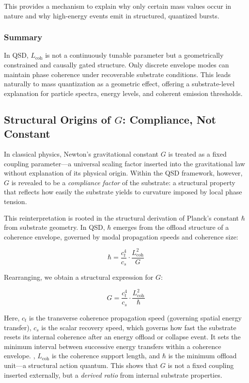 \documentclass[entropy,article,submit,pdftex,moreauthors]{Definitions/mdpi}
\begin{document}
This provides a mechanism to explain why only certain mass values occur in nature and why high-energy events emit in structured, quantized bursts.

\subsubsection{Summary}

In QSD, $L_{\text{coh}}$ is not a continuously tunable parameter but a geometrically constrained and causally gated structure. Only discrete envelope modes can maintain phase coherence under recoverable substrate conditions. This leads naturally to mass quantization as a geometric effect, offering a substrate-level explanation for particle spectra, energy levels, and coherent emission thresholds.

\subsection{Structural Origins of \texorpdfstring{$G$}{G}: Compliance, Not Constant}

In classical physics, Newton’s gravitational constant $G$ is treated as a fixed coupling parameter—a universal scaling factor inserted into the gravitational law without explanation of its physical origin. Within the QSD framework, however, $G$ is revealed to be a \textit{compliance factor} of the substrate: a structural property that reflects how easily the substrate yields to curvature imposed by local phase tension.

This reinterpretation is rooted in the structural derivation of Planck’s constant $\hbar$ from substrate geometry. In QSD, $\hbar$ emerges from the offload structure of a coherence envelope, governed by modal propagation speeds and coherence size:

\begin{equation}
\hbar = \frac{c_t^4}{c_s} \cdot \frac{L_{\text{coh}}^2}{G}
\end{equation}

Rearranging, we obtain a structural expression for $G$:

\begin{equation}
G = \frac{c_t^4}{c_s} \cdot \frac{L_{\text{coh}}^2}{\hbar}
\end{equation}

Here, $c_t$ is the transverse coherence propagation speed (governing spatial energy transfer), $c_s$ is the scalar recovery speed, which governs how fast the substrate resets its internal coherence after an energy offload or collapse event. It sets the minimum interval between successive energy transfers within a coherence envelope.
, $L_{\text{coh}}$ is the coherence support length, and $\hbar$ is the minimum offload unit—a structural action quantum. This shows that $G$ is not a fixed coupling inserted externally, but a \textit{derived ratio} from internal substrate properties.
\end{document}
